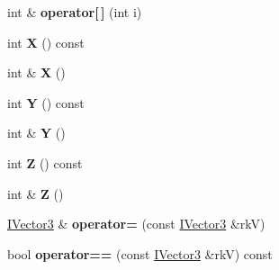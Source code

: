 \begin{DoxyCompactItemize}
\item 
int \& {\bfseries operator\mbox{[}$\,$\mbox{]}} (int i)\hypertarget{class_i_dream_sky_1_1_i_vector3_ae1ac2847553040347275d10984507db6}{}\label{class_i_dream_sky_1_1_i_vector3_ae1ac2847553040347275d10984507db6}

\item 
int {\bfseries X} () const \hypertarget{class_i_dream_sky_1_1_i_vector3_a8c68771eae47195c212be0190b41ec81}{}\label{class_i_dream_sky_1_1_i_vector3_a8c68771eae47195c212be0190b41ec81}

\item 
int \& {\bfseries X} ()\hypertarget{class_i_dream_sky_1_1_i_vector3_a1026c30aa7d14471d0625102e8d6750a}{}\label{class_i_dream_sky_1_1_i_vector3_a1026c30aa7d14471d0625102e8d6750a}

\item 
int {\bfseries Y} () const \hypertarget{class_i_dream_sky_1_1_i_vector3_a92c31068bd3f642580c934f3ebe2d833}{}\label{class_i_dream_sky_1_1_i_vector3_a92c31068bd3f642580c934f3ebe2d833}

\item 
int \& {\bfseries Y} ()\hypertarget{class_i_dream_sky_1_1_i_vector3_a5deb5e3b654329314a82587152ec369c}{}\label{class_i_dream_sky_1_1_i_vector3_a5deb5e3b654329314a82587152ec369c}

\item 
int {\bfseries Z} () const \hypertarget{class_i_dream_sky_1_1_i_vector3_a20d6bdf6148e6851a7c22a751e45a06d}{}\label{class_i_dream_sky_1_1_i_vector3_a20d6bdf6148e6851a7c22a751e45a06d}

\item 
int \& {\bfseries Z} ()\hypertarget{class_i_dream_sky_1_1_i_vector3_a2ca9d3ddac6535c2218c18fecde14559}{}\label{class_i_dream_sky_1_1_i_vector3_a2ca9d3ddac6535c2218c18fecde14559}

\item 
\hyperlink{class_i_dream_sky_1_1_i_vector3}{I\+Vector3} \& {\bfseries operator=} (const \hyperlink{class_i_dream_sky_1_1_i_vector3}{I\+Vector3} \&rkV)\hypertarget{class_i_dream_sky_1_1_i_vector3_aa0c86d5e289aec36ee92482402ceb2e5}{}\label{class_i_dream_sky_1_1_i_vector3_aa0c86d5e289aec36ee92482402ceb2e5}

\item 
bool {\bfseries operator==} (const \hyperlink{class_i_dream_sky_1_1_i_vector3}{I\+Vector3} \&rkV) const \hypertarget{class_i_dream_sky_1_1_i_vector3_aa26de359dde3a2cc676d0cd869615fdf}{}\label{class_i_dream_sky_1_1_i_vector3_aa26de359dde3a2cc676d0cd869615fdf}


\end{DoxyCompactItemize}
